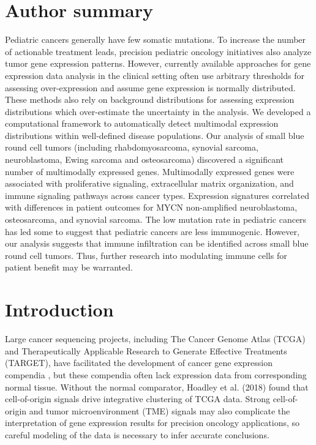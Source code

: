 \documentclass[10pt,letterpaper]{article}
\begin{document}
\section*{Author summary}
Pediatric cancers generally have few somatic mutations. To increase the number of actionable treatment leads, precision pediatric oncology initiatives also analyze tumor gene expression patterns. However, currently available approaches for gene expression data analysis in the clinical setting often use arbitrary thresholds for assessing over-expression and assume gene expression is normally distributed. These methods also rely on background distributions for assessing expression distributions which over-estimate the uncertainty in the analysis. We developed a computational framework to automatically detect multimodal expression distributions within well-defined disease populations. Our analysis of small blue round cell tumors (including rhabdomyosarcoma, synovial sarcoma, neuroblastoma, Ewing sarcoma and osteosarcoma) discovered a significant number of multimodally expressed genes. Multimodally expressed genes were associated with proliferative signaling, extracellular matrix organization, and immune signaling pathways across cancer types. Expression signatures correlated with differences in patient outcomes for MYCN non-amplified neuroblastoma, osteosarcoma, and synovial sarcoma. The low mutation rate in pediatric cancers has led some to suggest that pediatric cancers are less immunogenic. However, our analysis suggests that immune infiltration can be identified across small blue round cell tumors. Thus, further research into modulating immune cells for patient benefit may be warranted.

\linenumbers

\section*{Introduction}
Large cancer sequencing projects, including The Cancer Genome Atlas (TCGA) and Therapeutically Applicable Research to Generate Effective Treatments (TARGET), have facilitated the development of cancer gene expression compendia \cite{vivianToilEnablesReproducible2017, pughGeneticLandscapeHighrisk2013, goldmanUCSCXenaPlatform2018, thecancergenomeatlasresearchnetworkCancerGenomeAtlas2013, newtonTumorMapExploringMolecular2017, vaskeComparativeTumorRNA2019}, but these compendia often lack expression data from corresponding normal tissue. Without the normal comparator, Hoadley et al. (2018) found that cell-of-origin signals drive integrative clustering of TCGA data. Strong cell-of-origin and tumor microenvironment (TME) signals may also complicate the interpretation of gene expression results for precision oncology applications, so careful modeling of the data is necessary to infer accurate conclusions. 
\end{document}
